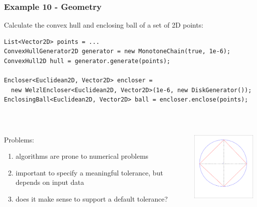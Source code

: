 \documentclass[14pt,mathserif]{beamer}
\begin{document}
\begin{frame}[fragile]
  \frametitle{Example 10 - Geometry} 

\begin{small}
Calculate the convex hull and enclosing ball of a set of 2D points:

\begin{verbatim}
List<Vector2D> points = ...
ConvexHullGenerator2D generator = new MonotoneChain(true, 1e-6);
ConvexHull2D hull = generator.generate(points);

Encloser<Euclidean2D, Vector2D> encloser =
  new WelzlEncloser<Euclidean2D, Vector2D>(1e-6, new DiskGenerator());
EnclosingBall<Euclidean2D, Vector2D> ball = encloser.enclose(points);
\end{verbatim}
\end{small}

\\
\begin{columns}
\begin{column}{.5\textwidth}
\begin{small}
Problems:
\begin{enumerate}
\item algorithms are prone to numerical problems
\item important to specify a meaningful tolerance, but depends on input data
\item does it make sense to support a default tolerance?
\end{enumerate}
\end{small}
\end{column}
\begin{column}{.5\textwidth}\raggedleft
\includegraphics[width=4cm]{geometry.png}
\end{column}
\end{columns}

\end{frame}

\end{document}
